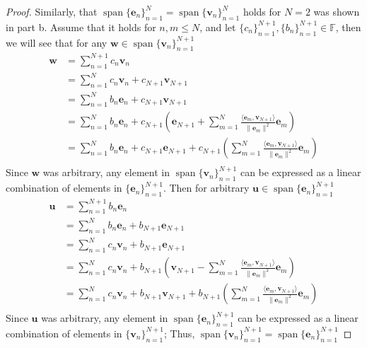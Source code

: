 \documentclass[12pt]{amsart}
\newcommand{\1}{\mathbbm{1}}
\numberwithin{equation}{section}
\numberwithin{Theorem}{section}
\theoremstyle{plain} %
\theoremstyle{definition}
\theoremstyle{remark}
\begin{document}
\begin{enumerate}[1.]
\begin{enumerate}[(a)]
\begin{proof}
		Similarly, that \(\operatorname{span} \{\mathbf{e}_{n}\}_{n=1}^{N} = \operatorname{span}\{\mathbf{v}_{n}\}_{n=1}^{N}\) holds for \(N=2\)
		was shown in part b. Assume that it holds for \(n,m\leq N\), 
		and let \(\{c_{n}\}_{n=1}^{N+1}, \{b_{n}\}_{n=1}^{N+1} \in \mathbb F\), 
		then we will see that for any 
		\(\mathbf w\in\operatorname{span} \{\mathbf{v}_{n}\}_{n=1}^{N+1}\)
		\begin{align*} \mathbf w
			&= \sum_{n=1}^{N+1}c_n\mathbf v_n \\
			&= \sum_{n=1}^{N}c_n\mathbf v_n + c_{N+1}\mathbf v_{N+1} \\
			&= \sum_{n=1}^{N}b_n\mathbf e_n + c_{N+1}\mathbf v_{N+1} \\
			&= \sum_{n=1}^{N}b_n\mathbf e_n + c_{N+1} \left( \mathbf{e}_{N+1}+\sum_{m=1}^{N}\frac{\langle\mathbf{e}_m,\mathbf{v}_{N+1}\rangle}{\|\mathbf{e}_m\|^2}\mathbf{e}_m \right) \\
			&= \sum_{n=1}^{N}b_n\mathbf e_n + c_{N+1} \mathbf{e}_{N+1}+c_{N+1}\left( \sum_{m=1}^{N}\frac{\langle\mathbf{e}_m,\mathbf{v}_{N+1}\rangle}{\|\mathbf{e}_m\|^2}\mathbf{e}_m \right) \\
		\end{align*}
		Since \(\mathbf w\) was arbitrary, any element in \(\operatorname{span} \{\mathbf{v}_{n}\}_{n=1}^{N+1}\) can be expressed as a 
		linear combination of elements in 
		\(\{\mathbf{e}_{n}\}_{n=1}^{N+1}\).
		Then for arbitrary \(\mathbf u\in\operatorname{span} \{\mathbf{e}_{n}\}_{n=1}^{N+1}\)
		\begin{align*} \mathbf u
			&= \sum_{n=1}^{N+1}b_n\mathbf e_n \\
			&= \sum_{n=1}^{N}b_n\mathbf e_n + b_{N+1}\mathbf e_{N+1} \\
			&= \sum_{n=1}^{N}c_n\mathbf v_n + b_{N+1}\mathbf e_{N+1} \\
			&= \sum_{n=1}^{N}c_n\mathbf v_n + b_{N+1} \left( \mathbf{v}_{N+1}-\sum_{m=1}^{N}\frac{\langle\mathbf{e}_m,\mathbf{v}_{N+1}\rangle}{\|\mathbf{e}_m\|^2}\mathbf{e}_m \right) \\
			&= \sum_{n=1}^{N}c_n\mathbf v_n + b_{N+1} \mathbf{v}_{N+1}+b_{N+1}\left( \sum_{m=1}^{N}\frac{\langle\mathbf{e}_m,\mathbf{v}_{N+1}\rangle}{\|\mathbf{e}_m\|^2}\mathbf{e}_m \right) \\
		\end{align*}
		Since \(\mathbf u\) was arbitrary, any element in \(\operatorname{span} \{\mathbf{e}_{n}\}_{n=1}^{N+1}\) can be expressed as a 
		linear combination of elements in 
		\(\{\mathbf{v}_{n}\}_{n=1}^{N+1}\);
		Thus, \( \operatorname{span} \{\mathbf{v}_{n}\}_{n=1}^{N+1} =
		\operatorname{span} \{\mathbf{e}_{n}\}_{n=1}^{N+1}\)
	\end{proof}


\end{enumerate}
\end{enumerate}
\end{document}

